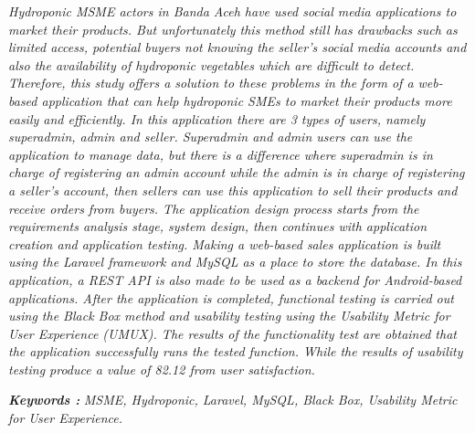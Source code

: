 \begin{abstracteng}
\textit{Hydroponic MSME actors in Banda Aceh have used social media applications to market their products. But unfortunately this method still has drawbacks such as limited access, potential buyers not knowing the seller's social media accounts and also the availability of hydroponic vegetables which are difficult to detect. Therefore, this study offers a solution to these problems in the form of a web-based application that can help hydroponic SMEs to market their products more easily and efficiently. In this application there are 3 types of users, namely superadmin, admin and seller. Superadmin and admin users can use the application to manage data, but there is a difference where superadmin is in charge of registering an admin account while the admin is in charge of registering a seller's account, then sellers can use this application to sell their products and receive orders from buyers. The application design process starts from the requirements analysis stage, system design, then continues with application creation and application testing. Making a web-based sales application is built using the Laravel framework and MySQL as a place to store the database. In this application, a REST API is also made to be used as a backend for Android-based applications. After the application is completed, functional testing is carried out using the Black Box method and usability testing using the Usability Metric for User Experience (UMUX). The results of the functionality test are obtained that the application successfully runs the tested function. While the results of usability testing produce a value of 82.12 from user satisfaction.}

\bigskip
\noindent
\textbf{\emph{Keywords :}} \textit{MSME, Hydroponic, Laravel, MySQL, Black Box, Usability Metric for User Experience.}
\end{abstracteng}